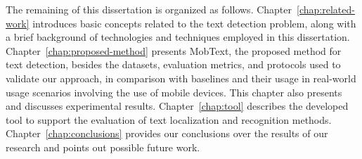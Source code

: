 
The remaining of this dissertation is organized as follows. Chapter~\ref{chap:related-work} introduces basic concepts related to the text detection problem, along with a brief background of technologies and techniques employed in this dissertation. Chapter~\ref{chap:proposed-method} presents MobText, the proposed method for text detection, besides the datasets, evaluation metrics, and protocols used to validate our approach, in comparison with baselines and their usage in real-world usage scenarios involving the use of mobile devices. This chapter also presents and discusses experimental results. %
Chapter~\ref{chap:tool} describes the developed tool to support the evaluation of text localization and recognition methods.
Chapter~\ref{chap:conclusions} provides our conclusions over the results of our research and points out possible future work. 



